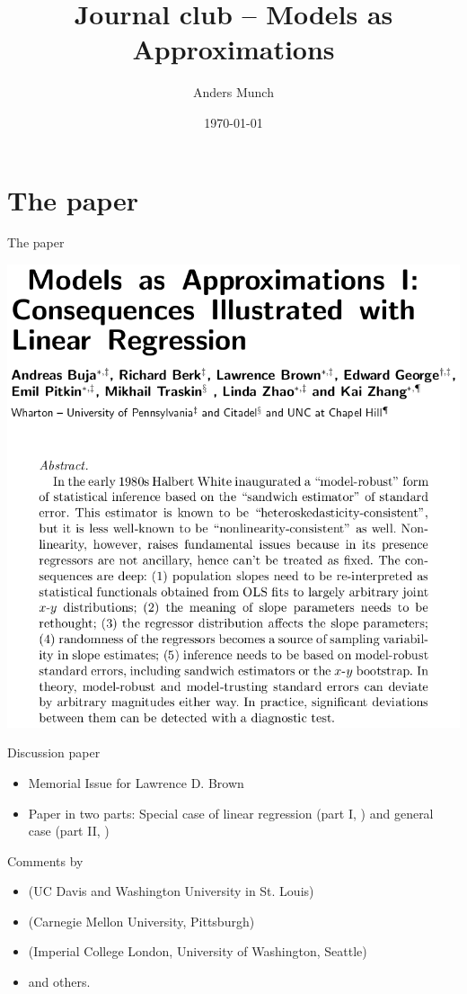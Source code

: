 \documentclass[smaller]{beamer}\usepackage{listings}
\author{Anders Munch}
\date{\today}
\title{Journal club -- Models as Approximations}
\begin{document}
\maketitle
\section{The paper}
\label{sec:org45e84a5}
\begin{frame}[label={sec:org3e05215}]{The paper}
\hfill

\begin{center}
\includegraphics[width=.9\linewidth]{./quotes/abstract.png}
\end{center}
\end{frame}

\begin{frame}[label={sec:orgf36b83d}]{Discussion paper}
\begin{itemize}
\item Memorial Issue for Lawrence D. Brown
\item Paper in two parts: Special case of linear regression (part I, \cite{buja2019models}) and general
case (part II, \cite{buja2019models2})
\end{itemize}
\hfill

\begin{block}{Comments by}
\begin{itemize}
\item \citeauthor*{ghanem2019discussion} (UC Davis and Washington University in St. Louis)
\item \citeauthor*{rinaldo2019comment} (Carnegie Mellon University, Pittsburgh)
\item \citeauthor*{whitney2019comment} (Imperial College London, University of Washington, Seattle)
\item and others.
\end{itemize}
\end{block}
\end{frame}
\end{document}
